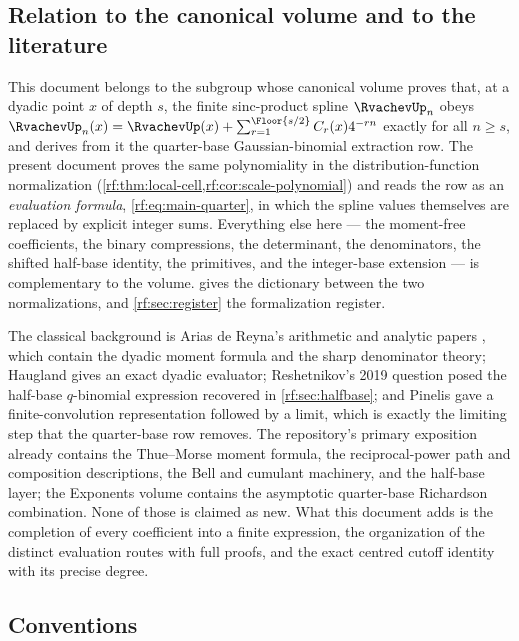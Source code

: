 \documentclass[11pt,oneside]{article}
\theoremstyle{plain}
\theoremstyle{definition}
\theoremstyle{remark}
\newcommand{\up}{\RvachevUp}                %
\begin{document}
\subsection{Relation to the canonical volume and to the literature}
\label{rf:sec:intro-relation}

This document belongs to the subgroup whose canonical volume
\cite{proveit-due} proves that, at a dyadic point $x$ of depth $s$, the
finite sinc-product spline $\up_{n}$ obeys
$\up_{n}(x)=\up(x)+\sum_{r=1}^{\Floor{s/2}}C_{r}(x)4^{-rn}$ exactly for all
$n\ge s$, and derives from it the quarter-base Gaussian-binomial extraction
row.  The present document proves the same polynomiality in the
distribution-function normalization
(\cref{rf:thm:local-cell,rf:cor:scale-polynomial}) and reads the row as an
\emph{evaluation formula}, \cref{rf:eq:main-quarter}, in which the spline
values themselves are replaced by explicit integer sums.  Everything else
here --- the moment-free coefficients, the binary compressions, the
determinant, the denominators, the shifted half-base identity, the
primitives, and the integer-base extension --- is complementary to the
volume.   gives the dictionary between the two
normalizations, and \cref{rf:sec:register} the formalization register.

The classical background is Arias de Reyna's arithmetic and analytic papers
\cite{arias1982,arias2018}, which contain the dyadic moment formula and the
sharp denominator theory; Haugland \cite{haugland} gives an exact dyadic
evaluator; Reshetnikov's 2019 question \cite{reshetnikov2019} posed the
half-base $q$-binomial expression recovered in \cref{rf:sec:halfbase}; and
Pinelis \cite{pinelis2020} gave a finite-convolution representation followed
by a limit, which is exactly the limiting step that the quarter-base row
removes.  The repository's primary exposition \cite{proveit-primary} already
contains the Thue--Morse moment formula, the reciprocal-power path and
composition descriptions, the Bell and cumulant machinery, and the half-base
layer; the Exponents volume \cite{proveit-exponents} contains the asymptotic
quarter-base Richardson combination.  None of those is claimed as new.  What
this document adds is the completion of every coefficient into a finite
expression, the organization of the distinct evaluation routes with full
proofs, and the exact centred cutoff identity with its precise degree.

\subsection{Conventions}
\label{rf:sec:intro-conventions}
\end{document}
